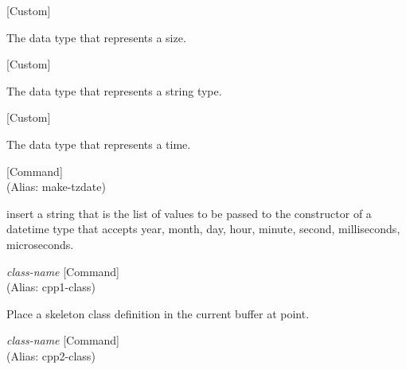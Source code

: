\vspace{1em}
\noindent
{}
\usebox{\funcname}
 \hfill [Custom]

\begin{doc-string}
The data type that represents a size.
\end{doc-string}

\vspace{1em}
\noindent
{}
\usebox{\funcname}
 \hfill [Custom]

\begin{doc-string}
The data type that represents a string type.
\end{doc-string}

\vspace{1em}
\noindent
{}
\usebox{\funcname}
 \hfill [Custom]

\begin{doc-string}
The data type that represents a time.
\end{doc-string}

\vspace{1em}
\noindent
{}
\usebox{\funcname}
 \hfill [Command]\\%
 (Alias: make-tzdate)

\begin{doc-string}
insert a string that is the list of values to be passed to the constructor of
 a datetime type that accepts year, month, day, hour, minute, second,
 milliseconds, microseconds.
\end{doc-string}

\vspace{1em}
\noindent
{}
\usebox{\funcname}\emph{class-name}
 \hfill [Command]\\%
 (Alias: cpp1-class)

\begin{doc-string}
Place a skeleton class definition in the current buffer at point.
\end{doc-string}

\vspace{1em}
\noindent
{}
\usebox{\funcname}\emph{class-name}
 \hfill [Command]\\%
 (Alias: cpp2-class)

